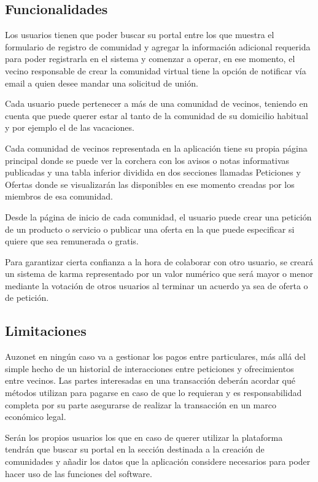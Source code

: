 \documentclass{DeustoFDP}
\begin{document}
\subsection{Funcionalidades}
Los usuarios tienen que poder buscar su portal entre los que muestra el formulario de registro de comunidad y agregar la información adicional requerida para poder registrarla en el sistema y comenzar a operar, en ese momento, el vecino responsable de crear la comunidad virtual tiene la opción de notificar vía email a quien desee mandar una solicitud de unión.

Cada usuario puede pertenecer a más de una comunidad de vecinos, teniendo en cuenta que puede querer estar al tanto de la comunidad de su domicilio habitual y por ejemplo el de las vacaciones.

Cada comunidad de vecinos representada en la aplicación tiene su propia página principal donde se puede ver la corchera con los avisos o notas informativas publicadas y una tabla inferior dividida en dos secciones llamadas Peticiones y Ofertas donde se visualizarán las disponibles en ese momento creadas por los miembros de esa comunidad.

Desde la página de inicio de cada comunidad, el usuario puede crear una petición de un producto o servicio o publicar una oferta en la que puede especificar si quiere que sea remunerada o gratis.

Para garantizar cierta confianza a la hora de colaborar con otro usuario, se creará un sistema de karma representado por un valor numérico que será mayor o menor mediante la votación de otros usuarios al terminar un acuerdo ya sea de oferta o de petición.

\subsection{Limitaciones}
Auzonet en ningún caso va a gestionar los pagos entre particulares, más allá del simple hecho de un historial de interacciones entre peticiones y ofrecimientos entre vecinos. Las partes interesadas en una transacción deberán acordar qué métodos utilizan para pagarse en caso de que lo requieran y es responsabilidad completa por su parte asegurarse de realizar la transacción en un marco económico legal.

Serán los propios usuarios los que en caso de querer utilizar la plataforma tendrán que buscar su portal en la sección destinada a la creación de comunidades y añadir los datos que la aplicación considere necesarios para poder hacer uso de las funciones del software.
\end{document}
